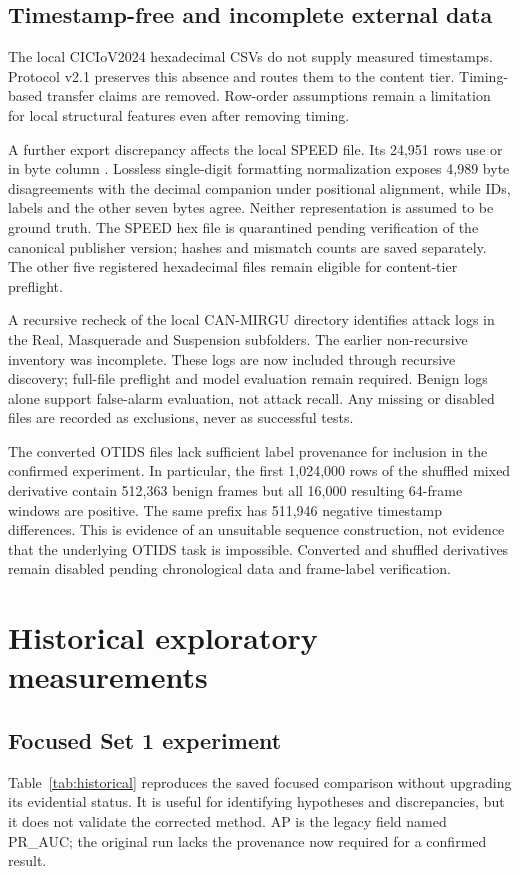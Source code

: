 \documentclass[12pt,a4paper,oneside,openany]{extbook}
\DeclareRobustCommand{\code}[1]{\texttt{\detokenize{#1}}}
\begin{document}
\subsection{Timestamp-free and incomplete external data}
The local CICIoV2024 hexadecimal CSVs do not supply measured timestamps. Protocol v2.1 preserves this absence and routes them to the content tier. Timing-based transfer claims are removed. Row-order assumptions remain a limitation for local structural features even after removing timing.

A further export discrepancy affects the local SPEED file. Its 24,951 rows use \code{2.0} or \code{0.0} in byte column \code{DATA_6}. Lossless single-digit formatting normalization exposes 4,989 byte disagreements with the decimal companion under positional alignment, while IDs, labels and the other seven bytes agree. Neither representation is assumed to be ground truth. The SPEED hex file is quarantined pending verification of the canonical publisher version; hashes and mismatch counts are saved separately. The other five registered hexadecimal files remain eligible for content-tier preflight.

A recursive recheck of the local CAN-MIRGU directory identifies attack logs in the Real, Masquerade and Suspension subfolders. The earlier non-recursive inventory was incomplete. These logs are now included through recursive discovery; full-file preflight and model evaluation remain required. Benign logs alone support false-alarm evaluation, not attack recall. Any missing or disabled files are recorded as exclusions, never as successful tests.

The converted OTIDS files lack sufficient label provenance for inclusion in the confirmed experiment. In particular, the first 1,024,000 rows of the shuffled mixed derivative contain 512,363 benign frames but all 16,000 resulting 64-frame windows are positive. The same prefix has 511,946 negative timestamp differences. This is evidence of an unsuitable sequence construction, not evidence that the underlying OTIDS task is impossible. Converted and shuffled derivatives remain disabled pending chronological data and frame-label verification.

\section{Historical exploratory measurements}
\subsection{Focused Set 1 experiment}
Table~\ref{tab:historical} reproduces the saved focused comparison without upgrading its evidential status. It is useful for identifying hypotheses and discrepancies, but it does not validate the corrected method. AP is the legacy field named PR\_AUC; the original run lacks the provenance now required for a confirmed result.
\end{document}

